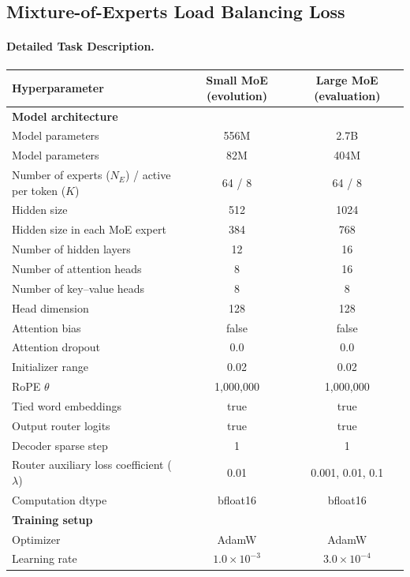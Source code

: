 \documentclass[11pt, a4paper]{include/gdm_format}
\begin{document}
{\clearpage
\subsection{Mixture-of-Experts Load Balancing Loss}

\paragraph{Detailed Task Description.}

\begin{table}[h]
\centering
\small
\begin{tabular}{lcc}
\toprule
\textbf{Hyperparameter} &
\textbf{Small MoE (evolution)} &
\textbf{Large MoE (evaluation)} \\
\midrule
\multicolumn{3}{l}{\textbf{Model architecture}} \\
\midrule
Model parameters & 556M & 2.7B \\
Model parameters & 82M & 404M \\
Number of experts ($N_E$) / active per token ($K$) & 64 / 8 & 64 / 8 \\
Hidden size & 512 & 1024 \\
Hidden size in each MoE expert & 384 & 768 \\
Number of hidden layers & 12 & 16 \\
Number of attention heads & 8 & 16 \\
Number of key--value heads & 8 & 8 \\
Head dimension & 128 & 128 \\
Attention bias & false & false \\
Attention dropout & 0.0 & 0.0 \\
Initializer range & 0.02 & 0.02 \\
RoPE $\theta$ & 1{,}000{,}000 & 1{,}000{,}000 \\
Tied word embeddings & true & true \\
Output router logits & true & true \\
Decoder sparse step & 1 & 1 \\
Router auxiliary loss coefficient ($\lambda$) & 0.01 & 0.001, 0.01, 0.1 \\
Computation dtype & bfloat16 & bfloat16 \\
\midrule
\multicolumn{3}{l}{\textbf{Training setup}} \\
\midrule
Optimizer & AdamW & AdamW \\
Learning rate & $1.0\times10^{-3}$ & $3.0\times10^{-4}$ \\

\end{tabular}
\end{table}}
\end{document}

